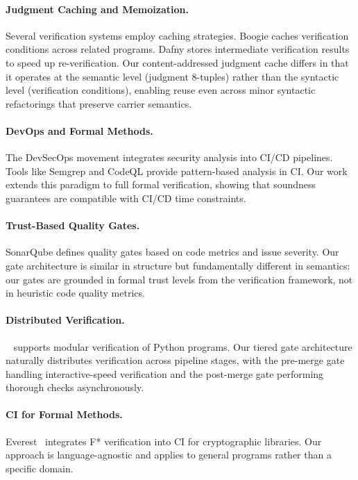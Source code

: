 \documentclass[11pt]{article}
\begin{document}
\paragraph{Judgment Caching and Memoization.}
Several verification systems employ caching strategies.
Boogie caches verification conditions across related programs.
Dafny stores intermediate verification results to speed up
re-verification. Our content-addressed judgment cache differs in that it
operates at the semantic level (judgment 8-tuples) rather than the
syntactic level (verification conditions), enabling reuse even across
minor syntactic refactorings that preserve carrier semantics.

\paragraph{DevOps and Formal Methods.}
The DevSecOps movement integrates security analysis into CI/CD pipelines.
Tools like Semgrep and CodeQL provide pattern-based analysis in CI.
Our work extends this paradigm to full formal verification, showing that
soundness guarantees are compatible with CI/CD time constraints.

\paragraph{Trust-Based Quality Gates.}
SonarQube defines quality gates based on code metrics and issue severity.
Our gate architecture is similar in structure but fundamentally different in
semantics: our gates are grounded in formal trust levels from the
verification framework, not in heuristic code quality metrics.

\paragraph{Distributed Verification.}
\Nagini{}~\cite{mueller2016nagini} supports modular verification of
Python programs. Our tiered gate architecture naturally distributes
verification across pipeline stages, with the pre-merge gate handling
interactive-speed verification and the post-merge gate performing thorough
checks asynchronously.

\paragraph{CI for Formal Methods.}
Everest~\cite{bhargavan2017everest} integrates F* verification into CI for
cryptographic libraries. Our approach is language-agnostic and applies to
general \Python{} programs rather than a specific domain.
\end{document}
